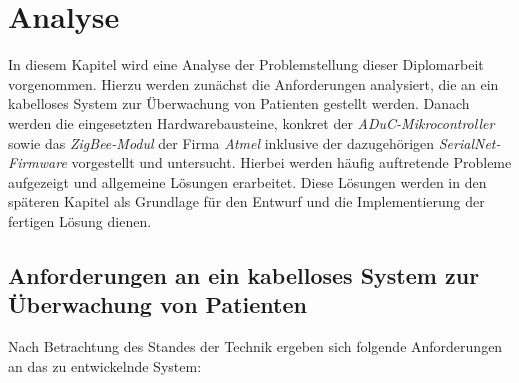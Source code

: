 \chapter{Analyse}\label{Analyse}

In diesem Kapitel wird eine Analyse der Problemstellung dieser Diplomarbeit vorgenommen. Hierzu 
werden zunächst die Anforderungen analysiert, die an ein kabelloses System zur Überwachung von 
Patienten gestellt werden. Danach werden die eingesetzten Hardwarebausteine, konkret der
\emph{ADuC-Mikrocontroller} sowie das \emph{ZigBee-Modul} der Firma \emph{Atmel} 
inklusive der dazugehörigen \emph{SerialNet-Firmware} vorgestellt und untersucht. Hierbei 
werden häufig auftretende Probleme aufgezeigt und allgemeine Lösungen erarbeitet. Diese
Lösungen werden in den späteren Kapitel als Grundlage für den Entwurf und die Implementierung
der fertigen Lösung dienen.

\section{Anforderungen an ein kabelloses System zur Überwachung von Patienten}\label{Anforderungen}
    Nach Betrachtung des Standes der Technik ergeben sich folgende Anforderungen
    an das zu entwickelnde System:
    

